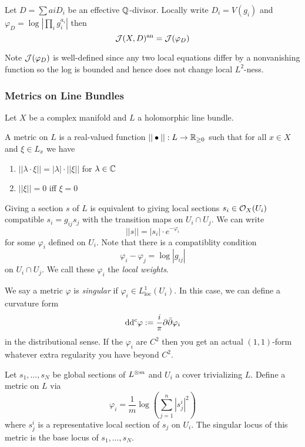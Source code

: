 \documentclass[12pt]{article}
\begin{document}
\begin{theorem}
Let $D = \sum ai D_i$ be an effective $\mathbb{Q}$-divisor. Locally write $D_i = V(g_i)$ and $\varphi_D = \log{\left| \prod_i g_i^{a_i} \right|}$ then 
\[ \mathcal{J}(X, D)^{\mathrm{an}} = \mathcal{J}(\varphi_D) \] 
\end{theorem}

Note $\mathcal{J}(\varphi_D)$ is well-defined since any two local equations differ by a nonvanishing  function so the log is bounded and hence does not change local $L^2$-ness.

\subsubsection{Metrics on Line Bundles}

Let $X$ be a complex manifold and $L$ a holomorphic line bundle.

\begin{defn}
A metric on $L$ is a real-valued function $|| \bullet || : L \to \mathbb{R}_{\ge 0}$ such that for all $x \in X$ and $\xi \in L_x$ we have
\begin{enumerate}
\item $|| \lambda \cdot \xi || = |\lambda| \cdot || \xi ||$ for $\lambda \in \mathbb{C}$
\item $|| \xi || = 0$ iff $\xi = 0$
\end{enumerate}
\end{defn}

Giving a section $s$ of $L$ is equivalent to giving local sections $s_i \in \mathcal{O}_{X}(U_i)$ compatible $s_i = g_{ij} s_j$ with the transition maps on $U_i \cap U_j$. We can write 
\[ || s || = |s_i| \cdot e^{-\varphi_i} \]
for some $\varphi_i$ defined on $U_i$. Note that there is a compatiblity condition
\[ \varphi_i - \varphi_j = \log{|g_{ij}|} \]
on $U_i \cap U_j$. We call these $\varphi_i$ the \textit{local weights}. 

\begin{defn}
We say a metric $\varphi$ is \textit{singular} if $\varphi_i \in L^1_{\text{loc}}(U_i)$. In this case, we can define a curvature form
\[ \mathrm{d} \mathrm{d}^c \varphi := \frac{i}{\pi} \partial \bar{\partial} \varphi_i \]
in the distributional sense. If the $\varphi_i$ are $C^2$ then you get an actual $(1,1)$-form whatever extra regularity you have beyond $C^2$.
\end{defn}

\begin{example}
Let $s_1, \dots, s_N$ be global sections of $L^{\otimes m}$ and $U_i$ a cover trivializing $L$. Define a metric on $L$ via
\[ \varphi_i = \frac{1}{m} \log{\left( \sum_{j = 1}^n |s^i_j|^2 \right)} \]
where $s^i_j$ is a representative local section of $s_j$ on $U_i$. The singular locus of this metric is the base locus of $s_1, \dots, s_N$. 
\end{example}
\end{document}
